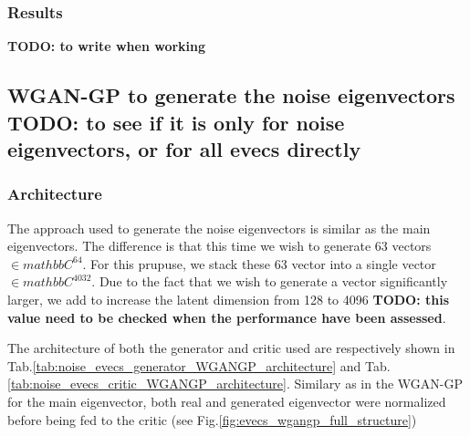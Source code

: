 \documentclass{article}
\begin{document}
\subsubsection{Results}

\textbf{TODO: to write when working}

\subsection{WGAN-GP to generate the noise eigenvectors \textbf{TODO: to see if it is only for noise eigenvectors, or for all evecs directly}}

\subsubsection{Architecture}

The approach used to generate the noise eigenvectors is similar as the main eigenvectors. The difference is that this time we wish to generate 63 vectors $\in mathbb{C}^64$. For this prupuse, we stack these 63 vector into a single vector $\in mathbb{C}^4032$. Due to the fact that we wish to generate a vector significantly larger, we add to increase the latent dimension from 128 to 4096 \textbf{TODO: this value need to be checked when the performance have been assessed}.

The architecture of both the generator and critic used are respectively shown in Tab.\ref{tab:noise_evecs_generator_WGANGP_architecture} and Tab.\ref{tab:noise_evecs_critic_WGANGP_architecture}. Similary as in the WGAN-GP for the main eigenvector, both real and generated eigenvector were normalized before being fed to the critic (see Fig.\ref{fig:evecs_wgangp_full_structure})
\end{document}
